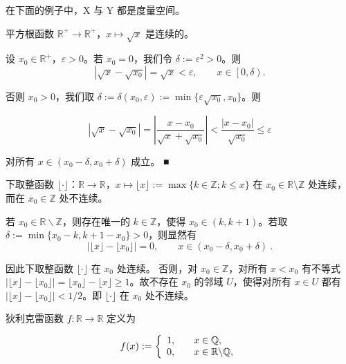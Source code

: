\begin{example}

在下面的例子中，X 与 Y 都是度量空间。

\begin{items}
\item

平方根函数 $ \mathbb{R}^+ \to \mathbb{R}^+ $，$ x \mapsto \sqrt{x} $ 是连续的。

\proofhead
设 $ x_0 \in \mathbb{R}^+ $，$ \varepsilon > 0 $。若 $ x_0 = 0 $，我们令 $ \delta := \varepsilon^2 > 0 $。则
\[
\left|\sqrt{x}-\sqrt{x_{0}}\right|=\sqrt{x}<\varepsilon,\qquad x\in\left[0,\delta\right).
\]

否则 $ x_0 > 0 $，我们取 $ \delta := \delta(x_0, \varepsilon) := \min\{\varepsilon \sqrt{x_0}, x_0\} $。则

\[
\left|\sqrt{x}-\sqrt{x_{0}}\right|=\left|\frac{x-x_{0}}{\sqrt{x}+\sqrt{x_{0}}}\right|<\frac{\left|x-x_{0}\right|}{\sqrt{x_{0}}}\leq\varepsilon
\]

对所有 $ x \in (x_0 - \delta, x_0 + \delta) $ 成立。 ■

\item

下取整函数 $ \lfloor \cdot \rfloor $：$ \mathbb{R} \to \mathbb{R} $，$ x \mapsto \lfloor x \rfloor := \max\{k \in \mathbb{Z} ; k \leq x\} $ 在 $ x_0 \in \mathbb{R} \setminus \mathbb{Z} $ 处连续，而在 $ x_0 \in \mathbb{Z} $ 处不连续。

\proofhead
若 $ x_0 \in \mathbb{R} \backslash \mathbb{Z} $，则存在唯一的 $ k \in \mathbb{Z} $，使得 $ x_0 \in (k, k+1) $。若取 $ \delta := \min\{x_0 - k, k+1 - x_0\} > 0 $，则显然有
\[
|\lfloor x\rfloor-\lfloor x_{0}\rfloor|=0,\qquad x\in(x_{0}-\delta,x_{0}+\delta)~.
\]

因此下取整函数 $ \lfloor \cdot \rfloor $ 在 $ x_{0} $ 处连续。
否则，对 $ x_0 \in \mathbb{Z} $，对所有 $ x < x_0 $ 有不等式 $ \left|\lfloor x \rfloor - \lfloor x_0 \rfloor\right| = \lfloor x_0 \rfloor - \lfloor x \rfloor \geq 1 $。故不存在 $ x_0 $ 的邻域 $ U $，使得对所有 $ x \in U $ 都有 $ \left|\lfloor x \rfloor - \lfloor x_0 \rfloor\right| < 1/2 $。即 $ \lfloor \cdot \rfloor $ 在 $ x_0 $ 处不连续。

\item

狄利克雷函数 $ f: \mathbb{R} \to \mathbb{R} $ 定义为

\begin{equation*}
f(x):=\left\{\begin{array}{l l}{1,}&{\quad x\in\mathbb{Q},}\\ {0,}&{\quad x\in\mathbb{R}\backslash\mathbb{Q},}\end{array}\right.
\end{equation*}


\end{items}
\end{example}
